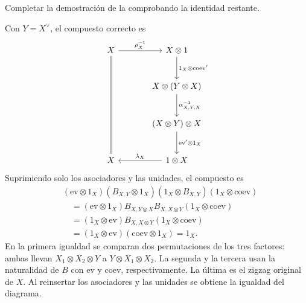 \begin{ejer}
Completar la demostración de la  comprobando la identidad restante.
\end{ejer}
\begin{sol}
Con $Y=X^\vee$, el compuesto correcto es
\[
\begin{tikzcd}[column sep=large,row sep=large]
X \arrow[r,"{\rho_X^{-1}}"] \arrow[ddd,equal]
 &X\otimes1 \arrow[d,"{1_X\otimes\mathrm{coev}'}"]\\
 &X\otimes(Y\otimes X) \arrow[d,"{\alpha^{-1}_{X,Y,X}}"]\\
 &(X\otimes Y)\otimes X \arrow[d,"{\mathrm{ev}'\otimes1_X}"]\\
X &1\otimes X \arrow[l,"{\lambda_X}"']
\end{tikzcd}
\]
Suprimiendo solo los asociadores y las unidades, el compuesto es
\[
\begin{aligned}
&(\mathrm{ev}\otimes1_X)
 (B_{X,Y}\otimes1_X)(1_X\otimes B_{X,Y})
 (1_X\otimes\mathrm{coev})\\
&\quad=(\mathrm{ev}\otimes1_X)
 B_{X,Y\otimes X}B_{X,X\otimes Y}
 (1_X\otimes\mathrm{coev})\\
&\quad=(1_X\otimes\mathrm{ev})
 B_{X,X\otimes Y}(1_X\otimes\mathrm{coev})\\
&\quad=(1_X\otimes\mathrm{ev})
 (\mathrm{coev}\otimes1_X)
=1_X.
\end{aligned}
\]
En la primera igualdad se comparan dos permutaciones de los tres factores: ambas llevan $X_1\otimes X_2\otimes Y$ a $Y\otimes X_1\otimes X_2$. La segunda y la tercera usan la naturalidad de $B$ con $\mathrm{ev}$ y $\mathrm{coev}$, respectivamente. La última es el zigzag original de $X$. Al reinsertar los asociadores y las unidades se obtiene la igualdad del diagrama.

\end{sol}



